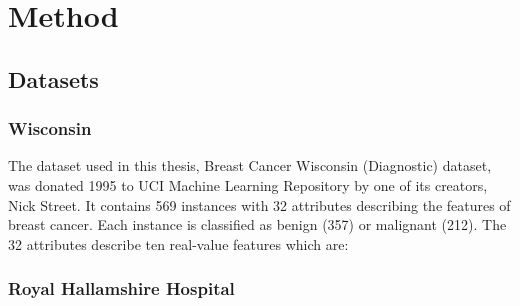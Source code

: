 \chapter{Method}

\section{Datasets}
\label{sec:Datasets}


\subsection{Wisconsin}

The dataset used in this thesis, Breast Cancer Wisconsin (Diagnostic) dataset, was donated 1995 to UCI  Machine Learning Repository \parencite{dua:2017} by one of its creators, Nick Street. It contains 569 instances with 32 attributes describing the features of breast cancer. Each instance is classified as benign (357) or malignant (212). The 32 attributes describe ten real-value features which are:



\subsection{Royal Hallamshire Hospital}

